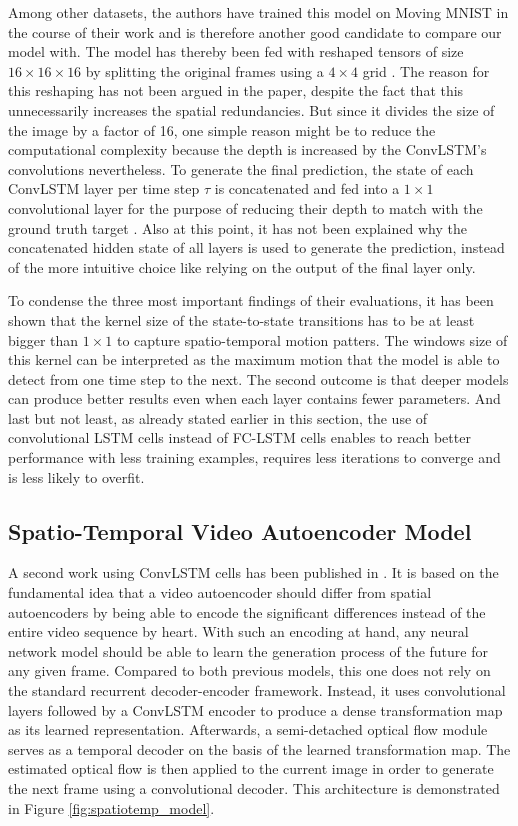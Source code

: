 Among other datasets, the authors have trained this model on Moving MNIST in the course of their work and is therefore another good candidate to compare our model with. The model has thereby been fed with reshaped tensors of size $16 \times 16 \times 16$ by splitting the original frames using a $4 \times 4$ grid \parencite[p. 6]{conv_lstm_nowcasting}. The reason for this reshaping has not been argued in the paper, despite the fact that this unnecessarily increases the spatial redundancies. But since it divides the size of the image by a factor of 16, one simple reason might be to reduce the computational complexity because the depth is increased by the ConvLSTM's convolutions nevertheless. To generate the final prediction, the state of each ConvLSTM layer per time step $\tau$ is concatenated and fed into a $1 \times 1$ convolutional layer for the purpose of reducing their depth to match with the ground truth target \parencite[p. 4]{conv_lstm_nowcasting}. Also at this point, it has not been explained why the concatenated hidden state of all layers is used to generate the prediction, instead of the more intuitive choice like relying on the output of the final layer only.

To condense the three most important findings of their evaluations, it has been shown that the kernel size of the state-to-state transitions has to be at least bigger than $1 \times 1$ to capture spatio-temporal motion patters. The windows size of this kernel can be interpreted as the maximum motion that the model is able to detect from one time step to the next. The second outcome is that deeper models can produce better results even when each layer contains fewer parameters. And last but not least, as already stated earlier in this section, the use of convolutional LSTM cells instead of FC-LSTM cells enables to reach better performance with less training examples, requires less iterations to converge and is less likely to overfit.


\subsection{Spatio-Temporal Video Autoencoder Model}

A second work using ConvLSTM cells has been published in \parencite{spat_temp_video_autoenc}. It is based on the fundamental idea that a video autoencoder should differ from spatial autoencoders by being able to encode the significant differences instead of the entire video sequence by heart. With such an encoding at hand, any neural network model should be able to learn the generation process of the future for any given frame. Compared to both previous models, this one does not rely on the standard recurrent decoder-encoder framework. Instead, it uses convolutional layers followed by a ConvLSTM encoder to produce a dense transformation map as its learned representation. Afterwards, a semi-detached optical flow module serves as a temporal decoder on the basis of the learned transformation map. The estimated optical flow is then applied to the current image in order to generate the next frame using a convolutional decoder. This architecture is demonstrated in Figure \ref{fig:spatiotemp_model}.

